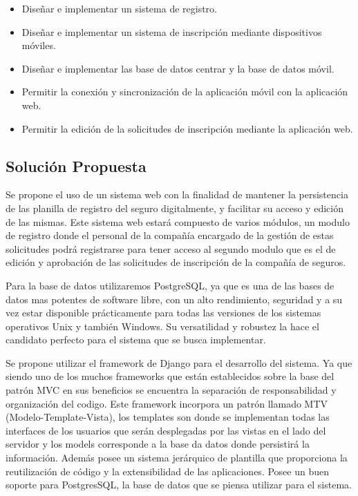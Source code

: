 \begin{itemize}

	\item Diseñar e implementar un sistema de registro.
	
	\item Diseñar e implementar un sistema de inscripción mediante dispositivos móviles.
	
	\item Diseñar e implementar las base de datos centrar y la base de datos móvil.
	
	\item Permitir la conexión y sincronización de la aplicación móvil con la aplicación web.
	
	\item Permitir la edición de la solicitudes de inscripción mediante la aplicación web.
	
	

\end{itemize}



\subsection{Solución Propuesta}
\setlength{\parskip}{5mm}
Se propone el uso de un sistema web con la finalidad de mantener la persistencia de las planilla de registro del seguro digitalmente, y facilitar su acceso y edición de las mismas. Este sistema web estará compuesto de varios módulos, un modulo de registro donde el personal de la compañía encargado de la gestión de estas solicitudes podrá registrarse para tener acceso al segundo modulo que es el de edición y aprobación de las solicitudes de inscripción de la compañía de seguros.

Para la base de datos utilizaremos PostgreSQL, ya que es una de las bases de datos mas potentes de software libre, con un alto rendimiento, seguridad y a su vez estar disponible prácticamente para todas las versiones de los sistemas operativos Unix y también Windows. Su versatilidad y robustez la hace el candidato perfecto para el sistema que se busca implementar.

Se propone utilizar el framework de Django para el desarrollo del sistema. Ya que siendo uno de los muchos frameworks que están establecidos sobre la base del patrón MVC en sus beneficios se encuentra la separación de responsabilidad y organización del codigo. Este framework incorpora un patrón llamado MTV (Modelo-Template-Vista), los templates son donde se implementan todas las interfaces de los usuarios que serán desplegadas por las vistas en el lado del servidor y los models corresponde a la base da datos donde persistirá la información. Además posee un sistema jerárquico de plantilla que proporciona la reutilización de código y la extensibilidad de las aplicaciones. Posee un buen soporte para PostgresSQL, la base de datos que se piensa utilizar para el sistema. 
\setlength{\parskip}{0mm}



